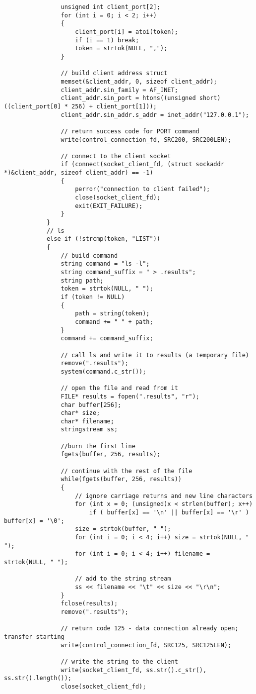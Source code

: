\documentclass[12pt,letter,titlepage]{article}
\begin{document}
{{\begin{verbatim}
				unsigned int client_port[2];
				for (int i = 0; i < 2; i++) 
				{
					client_port[i] = atoi(token);
					if (i == 1) break;
					token = strtok(NULL, ",");
				}

				// build client address struct
				memset(&client_addr, 0, sizeof client_addr);
				client_addr.sin_family = AF_INET;
				client_addr.sin_port = htons((unsigned short)((client_port[0] * 256) + client_port[1]));
				client_addr.sin_addr.s_addr = inet_addr("127.0.0.1");

				// return success code for PORT command
				write(control_connection_fd, SRC200, SRC200LEN);

				// connect to the client socket
				if (connect(socket_client_fd, (struct sockaddr *)&client_addr, sizeof client_addr) == -1)
				{
					perror("connection to client failed");
					close(socket_client_fd);
					exit(EXIT_FAILURE);
				}
			}
			// ls
			else if (!strcmp(token, "LIST"))
			{
				// build command
				string command = "ls -l";
				string command_suffix = " > .results";
				string path;
				token = strtok(NULL, " ");
				if (token != NULL) 
				{
					path = string(token);
					command += " " + path;
				}
				command += command_suffix;

				// call ls and write it to results (a temporary file)
				remove(".results");
				system(command.c_str());

				// open the file and read from it
				FILE* results = fopen(".results", "r");
				char buffer[256];
				char* size;
				char* filename;
				stringstream ss;

				//burn the first line
				fgets(buffer, 256, results);

				// continue with the rest of the file
				while(fgets(buffer, 256, results))
				{
					// ignore carriage returns and new line characters
					for (int x = 0; (unsigned)x < strlen(buffer); x++) 
						if ( buffer[x] == '\n' || buffer[x] == '\r' ) buffer[x] = '\0';
					size = strtok(buffer, " ");
					for (int i = 0; i < 4; i++) size = strtok(NULL, " ");
					for (int i = 0; i < 4; i++) filename = strtok(NULL, " ");

					// add to the string stream
					ss << filename << "\t" << size << "\r\n";
				}
				fclose(results);
				remove(".results");

				// return code 125 - data connection already open; transfer starting
				write(control_connection_fd, SRC125, SRC125LEN);

				// write the string to the client
				write(socket_client_fd, ss.str().c_str(), ss.str().length());
				close(socket_client_fd);


\end{verbatim}}}
\end{document}
